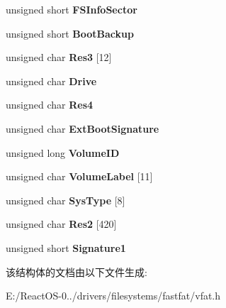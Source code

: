 \begin{DoxyCompactItemize}
\mbox{\label{struct___boot_sector32_aa7ddb8208465fd4fb37d332f2b72596d}} 
unsigned short {\bfseries F\+S\+Info\+Sector}
\item 
\mbox{\label{struct___boot_sector32_a4e91cba893e9515aa30e2a4efc638a71}} 
unsigned short {\bfseries Boot\+Backup}
\item 
\mbox{\label{struct___boot_sector32_abe2ca70c99a760e717518c3096c4e06c}} 
unsigned char {\bfseries Res3} \mbox{[}12\mbox{]}
\item 
\mbox{\label{struct___boot_sector32_a41c6dec29302b11f094975f589d98488}} 
unsigned char {\bfseries Drive}
\item 
\mbox{\label{struct___boot_sector32_aceb17621404fb364b4a3142c7e940747}} 
unsigned char {\bfseries Res4}
\item 
\mbox{\label{struct___boot_sector32_a20da05f17892dfea586a7ab5b3a44fb1}} 
unsigned char {\bfseries Ext\+Boot\+Signature}
\item 
\mbox{\label{struct___boot_sector32_ad48abd2647da73161dc78a97a45fc49a}} 
unsigned long {\bfseries Volume\+ID}
\item 
\mbox{\label{struct___boot_sector32_a80d8da6edd1390213e842c917f4fe246}} 
unsigned char {\bfseries Volume\+Label} \mbox{[}11\mbox{]}
\item 
\mbox{\label{struct___boot_sector32_a11024fe1d56a6ff4b43cc43cd8347cec}} 
unsigned char {\bfseries Sys\+Type} \mbox{[}8\mbox{]}
\item 
\mbox{\label{struct___boot_sector32_ae05ec08a6964d13fda7c07dc68a158dc}} 
unsigned char {\bfseries Res2} \mbox{[}420\mbox{]}
\item 
\mbox{\label{struct___boot_sector32_a61e0bd55f513334e54744134aec782c7}} 
unsigned short {\bfseries Signature1}
\end{DoxyCompactItemize}


该结构体的文档由以下文件生成\+:\begin{DoxyCompactItemize}
\item 
E\+:/\+React\+O\+S-\/0../drivers/filesystems/fastfat/vfat.\+h\end{DoxyCompactItemize}
